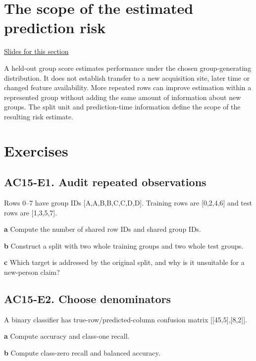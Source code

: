 \documentclass[11pt,letterpaper]{article}
\theoremstyle{definition}\newtheorem{definition}{Definition}\newtheorem{example}{Example}
\numberwithin{equation}{section}
\begin{document}
\section{The scope of the estimated prediction risk}
\hypertarget{note-the-scope-of-the-estimated-prediction-risk}{}\label{note:the-scope-of-the-estimated-prediction-risk}
{\small \href{slides.html\#frame=recognition-is-not-new-group-prediction\&step=1}{Slides for this section}}\par


A held-out group score estimates performance under the chosen group-generating distribution. It does not establish transfer to a new acquisition site, later time or changed feature availability. More repeated rows can improve estimation within a represented group without adding the same amount of information about new groups. The split unit and prediction-time information define the scope of the resulting risk estimate.
\bigskip
\section*{Exercises}
\par\noindent\begin{minipage}{\linewidth}
\subsection*{AC15-E1. Audit repeated observations}
Rows 0--7 have group IDs [A,A,B,B,C,C,D,D]. Training rows are [0,2,4,6] and test rows are [1,3,5,7].

\textbf{a} Compute the number of shared row IDs and shared group IDs.

\end{minipage}\par\medskip
\textbf{b} Construct a split with two whole training groups and two whole test groups.

\textbf{c} Which target is addressed by the original split, and why is it unsuitable for a new-person claim?

\par\noindent\begin{minipage}{\linewidth}
\subsection*{AC15-E2. Choose denominators}
A binary classifier has true-row/predicted-column confusion matrix [[45,5],[8,2]].

\textbf{a} Compute accuracy and class-one recall.

\end{minipage}\par\medskip
\textbf{b} Compute class-zero recall and balanced accuracy.
\end{document}
